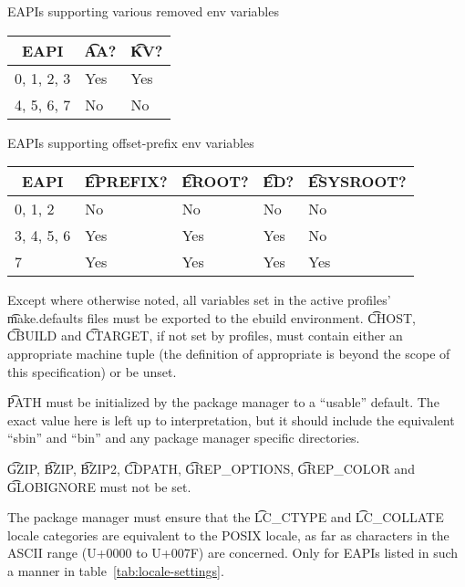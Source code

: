 \begin{centertable}{EAPIs supporting various removed env variables}
    \label{tab:removed-env-vars-table}
    \begin{tabular}{lll}
      \toprule
      \multicolumn{1}{c}{\textbf{EAPI}} &
      \multicolumn{1}{c}{\textbf{\t{AA}?}} &
      \multicolumn{1}{c}{\textbf{\t{KV}?}} \\
      \midrule
      0, 1, 2, 3        & Yes & Yes \\
      4, 5, 6, 7        & No  & No  \\
      \bottomrule
    \end{tabular}
\end{centertable}

\begin{centertable}{EAPIs supporting offset-prefix env variables}
    \label{tab:offset-env-vars-table}
    \begin{tabular}{lllll}
      \toprule
      \multicolumn{1}{c}{\textbf{EAPI}} &
      \multicolumn{1}{c}{\textbf{\t{EPREFIX}?}} &
      \multicolumn{1}{c}{\textbf{\t{EROOT}?}} &
      \multicolumn{1}{c}{\textbf{\t{ED}?}} &
      \multicolumn{1}{c}{\textbf{\t{ESYSROOT}?}} \\
      \midrule
      0, 1, 2           & No  & No  & No  & No  \\
      3, 4, 5, 6        & Yes & Yes & Yes & No  \\
      7                 & Yes & Yes & Yes & Yes \\
      \bottomrule
    \end{tabular}
\end{centertable}

Except where otherwise noted, all variables set in the active profiles' \t{make.defaults} files must
be exported to the ebuild environment. \t{CHOST}, \t{CBUILD} and \t{CTARGET}, if not set by
profiles, must contain either an appropriate machine tuple (the definition of appropriate is beyond
the scope of this specification) or be unset.

\t{PATH} must be initialized by the package manager to a ``usable'' default.  The exact value here
is left up to interpretation, but it should include the equivalent ``sbin'' and ``bin'' and any
package manager specific directories.

\t{GZIP}, \t{BZIP}, \t{BZIP2}, \t{CDPATH}, \t{GREP_OPTIONS}, \t{GREP_COLOR} and \t{GLOBIGNORE}
must not be set.

 The package manager must ensure that the \t{LC_CTYPE} and
\t{LC_COLLATE} locale categories are equivalent to the POSIX locale, as far as characters in the
ASCII range (U+0000 to U+007F) are concerned. Only for EAPIs listed in such a manner in
table~\ref{tab:locale-settings}.

